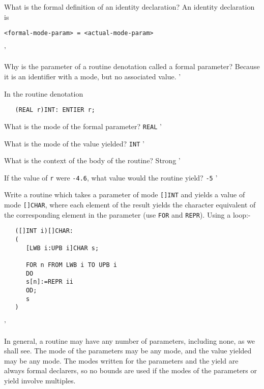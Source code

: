 \begin{exercise}
\item What is the formal definition of an identity declaration?
\ans An identity declaration is
\begin{verbatim}
<formal-mode-param> = <actual-mode-param>
\end{verbatim}
'
\item Why is the parameter of a routine denotation called a formal
parameter? \ans Because it is an identifier with a mode, but no
associated value.
'
\item In the routine denotation
\begin{verbatim}
   (REAL r)INT: ENTIER r;
\end{verbatim}
\indent\begin{subex}
\item What is the mode of the formal parameter? \subans \verb|REAL|
'
\item What is the mode of the value yielded? \subans \verb|INT|
'
\item What is the context of the body of the routine? \subans Strong
'
\item If the value of \verb|r| were \verb|-4.6|, what value
would the routine yield? \subans \verb|-5|
'
\end{subex}
\item Write a routine which takes a parameter of mode \verb|[]INT| and
yields a value of mode \verb|[]CHAR|, where each element of the result
yields the character equivalent of the corresponding element in the
parameter (use \verb|FOR| and \verb|REPR|). \ans Using a loop:-
\begin{verbatim}
   ([]INT i)[]CHAR:
   (
      [LWB i:UPB i]CHAR s;

      FOR n FROM LWB i TO UPB i
      DO
      s[n]:=REPR ii
      OD;
      s
   )
\end{verbatim}
'
\end{exercise}
\vfill

In general, a routine may have any number of parameters, including
none, as we shall see. The mode of the parameters may be any mode,
and the value yielded may be any mode. The modes written for the
parameters and the yield are always formal declarers, so no bounds
are used if the modes of the parameters or yield involve multiples.

